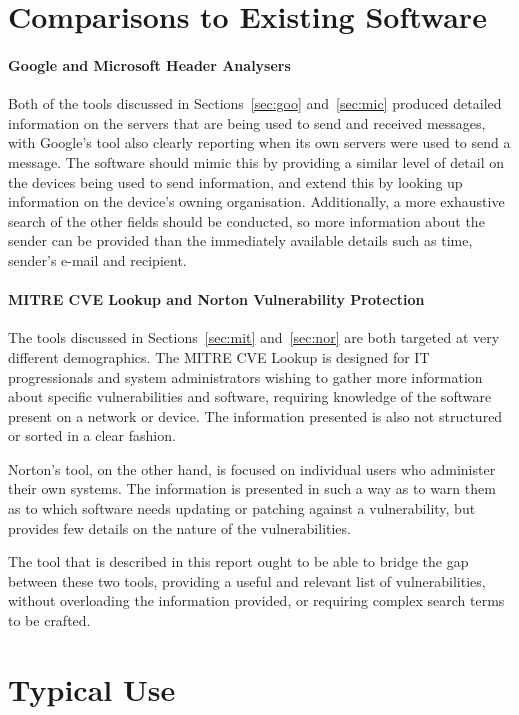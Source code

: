   \section{Comparisons to Existing Software}

  \paragraph{Google and Microsoft Header Analysers} Both of the tools discussed in Sections~\ref{sec:goo} and~\ref{sec:mic} produced detailed information on the servers that are being used to send and received messages, with Google's tool also clearly reporting when its own servers were used to send a message.  The software should mimic this by providing a similar level of detail on the devices being used to send information, and extend this by looking up information on the device's owning organisation.  Additionally, a more exhaustive search of the other fields should be conducted, so more information about the sender can be provided than the immediately available details such as time, sender's e-mail and recipient.

  \paragraph{MITRE CVE Lookup and Norton Vulnerability Protection} The tools discussed in Sections~\ref{sec:mit} and~\ref{sec:nor} are both targeted at very different demographics.  The MITRE CVE Lookup is designed for IT progressionals and system administrators wishing to gather more information about specific vulnerabilities and software, requiring knowledge of the software present on a network or device.  The information presented is also not structured or sorted in a clear fashion.

  Norton's tool, on the other hand, is focused on individual users who administer their own systems.  The information is presented in such a way as to warn them as to which software needs updating or patching against a vulnerability, but provides few details on the nature of the vulnerabilities.

  The tool that is described in this report ought to be able to bridge the gap between these two tools, providing a useful and relevant list of vulnerabilities, without overloading the information provided, or requiring complex search terms to be crafted. 

  \section{Typical Use}

